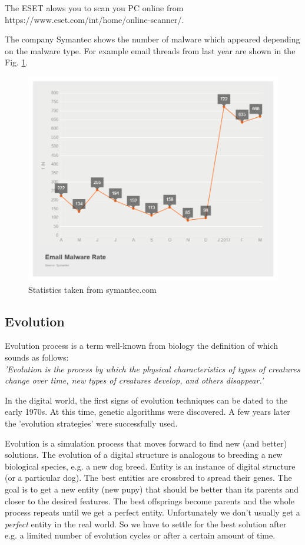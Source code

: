 \documentclass[review]{elsarticle}
\begin{document}
The ESET alows you to scan you PC online from https://www.eset.com/int/home/online-scanner/.

The company Symantec shows the number of malware which appeared depending on the malware type. For example email threads from last year \cite{symantec} are shown in the Fig. \ref{pict:email}.


\begin{figure}[!ht]
\centering
\caption{Statistics taken from symantec.com}
\label{pict:email}
\includegraphics[scale=0.3]{pict/email.png}
\end{figure}


\newpage
\subsection{Evolution}
Evolution process is a term well-known from biology the definition of which sounds as follows: \\
\textit{'Evolution is the process by which the physical characteristics of types of creatures change over time, new types of creatures develop, and others disappear.'} \cite{evolution}
\vspace{5pt}

In the digital world, the first signs of evolution techniques can be dated to the early 1970s. At this time, genetic algorithms were discovered. A few years later the 'evolution strategies' were successfully used. \cite{zelinkaEvol}

Evolution is a simulation process that moves forward to find new (and better) solutions. The evolution of a digital structure is analogous to breeding a new biological species, e.g. a new dog breed. Entity is an instance of digital structure (or a particular dog). The best entities are crossbred to spread their genes. The goal is to get a new entity (new pupy) that should be better than its parents and closer to the desired features. The best offsprings become parents and the whole process repeats until we get a perfect entity. Unfortunately we don't usually get a \textit{perfect} entity in the real world. So we have to settle for the best solution after e.g. a limited number of evolution cycles or after a certain amount of time. 
\end{document}

